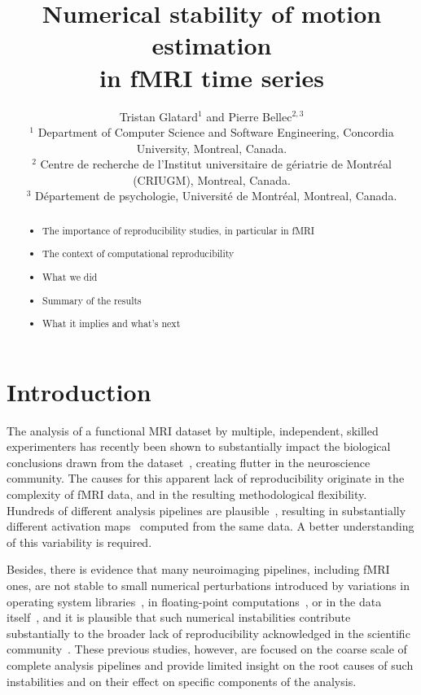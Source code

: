 \documentclass[11pt]{IEEEtran}
\title{Numerical stability of motion estimation\\ in fMRI time series}
\author{Tristan Glatard$^1$ and Pierre Bellec$^{2,3}$\\
$^1$ Department of Computer Science and Software Engineering, Concordia University, Montreal, Canada. \\
$^2$ Centre de recherche de l'Institut universitaire de gériatrie de Montréal (CRIUGM), Montreal, Canada.\\
$^3$ Département de psychologie, Université de Montréal, Montreal, Canada.

}
\begin{document}
\maketitle

\begin{abstract}
    \begin{itemize}
        \item The importance of reproducibility studies, in particular in fMRI 
        \item The context of computational reproducibility
        \item What we did
        \item Summary of the results 
        \item What it implies and what's next
    \end{itemize}
\end{abstract}

\section{Introduction}

 The analysis of a functional MRI dataset by multiple, independent, skilled
 experimenters has recently been shown to substantially impact the
 biological conclusions drawn from the dataset~\cite{botvinik2020variability}, creating
 flutter in the neuroscience community. The causes for this apparent lack
 of reproducibility originate in the complexity of fMRI data, and in
 the resulting methodological flexibility. Hundreds of different analysis
 pipelines are plausible~\cite{carp2012plurality}, resulting in substantially different
 activation maps~\cite{bowring2019exploring, Pauli et al 2016 inside} computed from the same data. A better understanding of this variability
 is required.

 Besides, there is evidence that many neuroimaging pipelines, including
 fMRI ones, are not stable to small numerical perturbations introduced by
 variations in operating system libraries~\cite{gronenschild2012effects,
 glatard2015reproducibility}, in floating-point computations~\cite{kiar2020comparing},
 or in the data itself~\cite{Lewis2017-ll}, and it is plausible that such numerical
 instabilities contribute substantially to the broader lack of
 reproducibility acknowledged in the scientific community~\cite{kennedy2019everything, baker2016reproducibility}. 
 These previous studies, however, are focused on the coarse scale
 of complete analysis pipelines and provide limited insight on the root
 causes of such instabilities and on their effect on specific components of
 the analysis.
\end{document}
